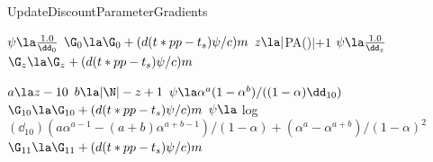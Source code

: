 \begin{algorithm}
	\caption{UpdateDiscountParameterGradients} \label{alg:updatediscountparametergradients}
	\begin{algorithmic}[1]


				\State $ \psi \la \frac{1.0}{\dd_0}$
				\State $\G_0 \la \G_0 + (d(t * pp - t_s)\psi / c)  m$
			\Else
				\State $z \la |$\textsc{PA}(\N)$| + 1$
					\State $\psi \la \frac{1.0}{\dd_z}$
					\State $\G_z \la \G_z + (d(t * pp - t_s) \psi / c)  m$	
				\EndWhile
				
					\State $a \la z - 10$
					\State $b \la |\N| - z + 1$
					\State $\psi \la \alpha^a(1 - \alpha^b) / ((1 - \alpha)  \dd_{10})$ 
					\State $\G_{10} \la \G_{10} + (d(t * pp - t_s) \psi / c)  m$	
					\State $\psi \la$ log$(\dd_{10}) (a \alpha^{a-1} - (a + b)\alpha^{a + b-1}) / (1 - \alpha) + (\alpha^a - \alpha^{a + b}) / (1 - \alpha)^2$
					\State $\G_{11} \la \G_{11} + (d(t * pp - t_s)\psi / c)  m$	
				\EndIf
			\EndIf
		\EndIf
	\EndFunction

	\end{algorithmic}	
\end{algorithm}

